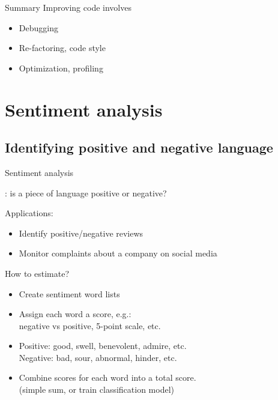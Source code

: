 \documentclass[aspectratio=169,usenames,dvipsnames]{beamer}
\begin{document}
\begin{frame}{Summary}
    Improving code involves
    \begin{itemize}
        \item Debugging
        \item Re-factoring, code style
        \item Optimization, profiling
    \end{itemize}
\end{frame}





\section{Sentiment analysis}
\subsection{Identifying positive and negative language}
\frame{\tableofcontents[currentsection]}

\begin{frame}{Sentiment analysis}
    \begin{definition}
        : 
            is a piece of language positive or negative?
    \end{definition}

    Applications:
    \begin{itemize}
        \item Identify positive/negative reviews
        \item Monitor complaints about a company on social media
    \end{itemize}

    \pause
    How to estimate?
    \begin{itemize}
        \item Create sentiment word lists
        \item Assign each word a score, e.g.: \\
            negative vs positive, 5-point scale, etc.
        \item Positive: good, swell, benevolent, admire, etc. \\
                Negative: bad, sour, abnormal, hinder, etc.
        \item Combine scores for each word into a total score. \\
                (simple sum, or train classification model)
    \end{itemize}
\end{frame}
\end{document}
